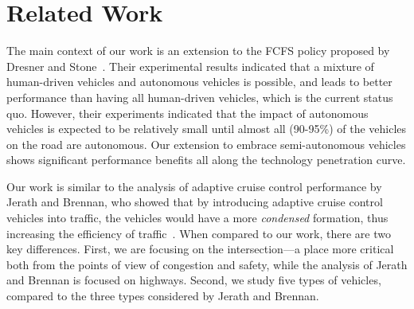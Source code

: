 \section{Related Work}
\label{sec:related}

The main context of our work is an extension to the FCFS policy
proposed by Dresner and Stone~\cite{bib:Dresner08Multiagent}. Their
experimental results indicated that a mixture of human-driven vehicles
and autonomous vehicles is possible, and leads to better performance
than having all human-driven vehicles, which is the current status
quo.  However, their experiments indicated that the impact of
autonomous vehicles is expected to be relatively small until almost all (90-95\%) of
the vehicles on the road are autonomous.  Our extension to embrace
semi-autonomous vehicles shows significant performance benefits all
along the technology penetration curve.

Our work is similar to the analysis of adaptive cruise control
performance by Jerath and Brennan, who showed that by introducing
adaptive cruise control vehicles into traffic, the vehicles would have
a more \textit{condensed} formation, thus increasing the efficiency
of traffic~\cite{bib:Jerath10adaptive}.  When compared to our work,
there are two key differences.  First, we are focusing on the
intersection---a place more critical both from the points of view of
congestion and safety, while the analysis of Jerath and Brennan is
focused on highways.  Second, we study five types of vehicles,
compared to the three types considered by Jerath and Brennan.


